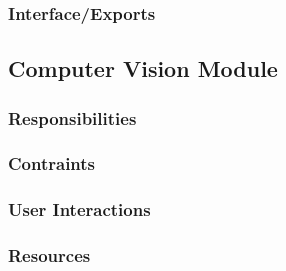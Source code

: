 \subsubsection{Interface/Exports}
\label{sec:exports}


\subsection{Computer Vision Module}
\label{sec:vision_design}

\subsubsection{Responsibilities}
\label{sec:responsibilities}

\subsubsection{Contraints}
\label{sec:constraints}

\subsubsection{User Interactions}
\label{sec:interactions}

\subsubsection{Resources}
\label{sec:resources}

